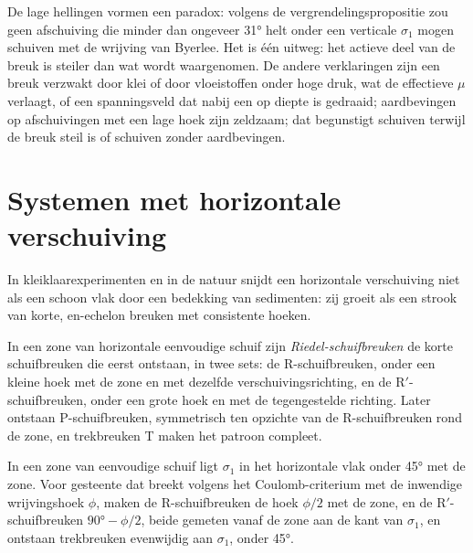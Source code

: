 De lage hellingen vormen een paradox: volgens de vergrendelingspropositie zou geen afschuiving die
minder dan ongeveer \ang{31} helt onder een verticale $\sigma_1$ mogen schuiven met
de wrijving van Byerlee. Het  is één uitweg: het actieve deel van de
breuk is steiler dan wat wordt waargenomen. De andere verklaringen zijn een breuk verzwakt door klei
of door vloeistoffen onder hoge druk, wat de effectieve $\mu$ verlaagt, of een spanningsveld dat nabij een
 op diepte is gedraaid; aardbevingen op afschuivingen met een lage hoek zijn
zeldzaam; dat begunstigt schuiven terwijl de breuk steil is of schuiven zonder aardbevingen.

\section{Systemen met horizontale verschuiving}\label{sec:b3:extension-strike-slip:strike-slip}

In kleiklaarexperimenten en in de natuur snijdt een horizontale verschuiving
niet als een schoon vlak door een bedekking van sedimenten: zij groeit als een strook van korte,
en-echelon breuken met consistente hoeken.

\begin{definition}\label{def:b3:extension-strike-slip:riedel}
In een zone van horizontale eenvoudige schuif zijn \emph{Riedel-schuifbreuken}
de korte schuifbreuken die eerst ontstaan, in twee sets: de R-schuifbreuken,
onder een kleine hoek met de zone en met dezelfde verschuivingsrichting, en de R$'$-schuifbreuken,
onder een grote hoek en met de tegengestelde richting. Later ontstaan P-schuifbreuken,
symmetrisch ten opzichte van de R-schuifbreuken rond de zone, en trekbreuken T maken het patroon compleet.
\end{definition}

\begin{proposition}\label{prop:b3:extension-strike-slip:riedel}
In een zone van eenvoudige schuif ligt $\sigma_1$ in het horizontale vlak
onder \ang{45} met de zone. Voor gesteente dat breekt volgens het Coulomb-criterium met de
inwendige wrijvingshoek $\phi$, maken de R-schuifbreuken de hoek $\phi/2$ met de zone, en de
R$'$-schuifbreuken $\ang{90} - \phi/2$, beide gemeten vanaf de zone aan de kant van $\sigma_1$, en
ontstaan trekbreuken evenwijdig aan $\sigma_1$,
onder \ang{45}.
\end{proposition}

